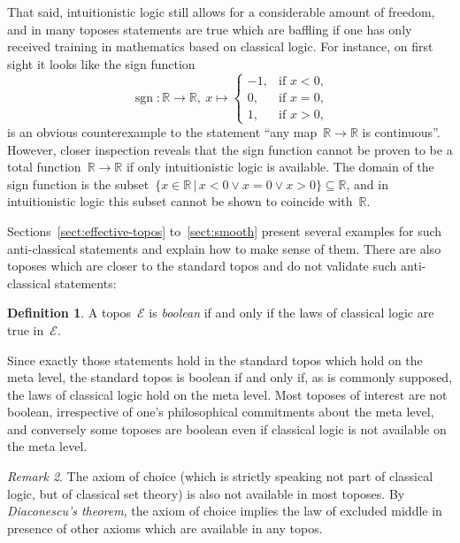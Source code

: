 \documentclass[oneside,reqno]{amsart}
\theoremstyle{definition}
\newtheorem{defn}{Definition}[section]
\theoremstyle{plain}
\theoremstyle{remark}
\newtheorem{rem}[defn]{Remark}
\newcommand{\E}{\mathcal{E}}
\newcommand{\RR}{\mathbb{R}}
\renewcommand{\_}{\mathpunct{.}\,}
\newcommand{\?}{\,{:}\,}
\begin{document}
That said, intuitionistic logic still allows for a considerable amount of
freedom, and in many toposes statements are true which are baffling if one has
only received training in mathematics based on classical logic. For instance, on first sight it
looks like the sign function
\[ \operatorname{sgn} : \RR \longrightarrow \RR,\ x \longmapsto \begin{cases}
  -1, & \text{if $x < 0$,} \\
  0, & \text{if $x = 0$,} \\
  1, & \text{if $x > 0$,}
\end{cases} \]
is an obvious counterexample to the statement ``any map~$\RR \to \RR$ is
continuous''. However, closer inspection reveals that the sign function
cannot be proven to be a total function~$\RR \to \RR$ if only intuitionistic
logic is available. The domain of the sign
function is the subset~$\{ x \in \RR \,|\, x < 0 \vee x = 0 \vee x > 0 \}
\subseteq \RR$, and in intuitionistic logic this subset cannot be shown to
coincide with~$\RR$.

Sections~\ref{sect:effective-topos} to~\ref{sect:smooth} present several
examples for such anti-classical statements and explain how to make sense of
them. There are also toposes which are closer to the standard topos and do not validate such
anti-classical statements:

\begin{defn}A topos~$\E$ is \emph{boolean} if and only if the laws of classical
logic are true in~$\E$.\end{defn}

Since exactly those statements hold in the standard topos which hold on the
meta level, the standard topos is boolean if and only if, as is commonly supposed, the laws
of classical logic hold on the meta level. Most toposes of interest are not
boolean, irrespective of one's philosophical commitments about the meta level,
and conversely some toposes are boolean even if classical logic is not
available on the meta level.

\begin{rem}The axiom of choice (which is strictly speaking not part of
classical logic, but of classical set theory) is also not available in most
toposes. By \emph{Diaconescu's theorem}, the axiom of choice implies the law of
excluded middle in presence of other axioms which are available in any topos.
\end{rem}

\end{document}

